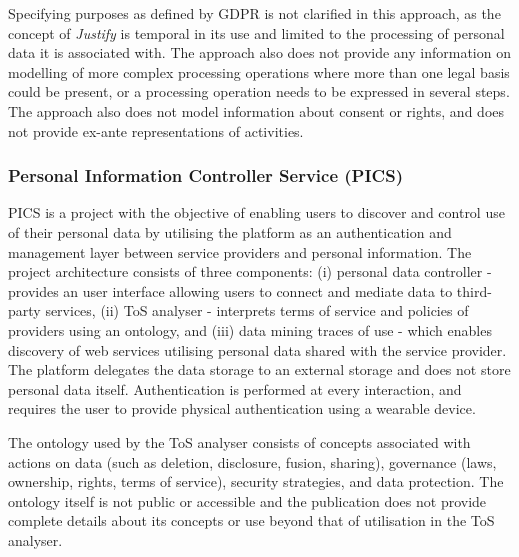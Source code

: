 Specifying purposes as defined by GDPR is not clarified in this approach, as the concept of \textit{Justify} is temporal in its use and limited to the processing of personal data it is associated with. The approach also does not provide any information on modelling of more complex processing operations where more than one legal basis could be present, or a processing operation needs to be expressed in several steps. The approach also does not model information about consent or rights, and does not provide ex-ante representations of activities.

\subsubsection{Personal Information Controller Service (PICS)}
PICS is a project with the objective of enabling users to discover and control use of their personal data by utilising the platform as an authentication and management layer between service providers and personal information. The project architecture \cite{winckler_personal_2019} consists of three components: (i) personal data controller - provides an user interface allowing users to connect and mediate data to third-party services, (ii) ToS analyser - interprets terms of service and policies of providers using an ontology, and (iii) data mining traces of use - which enables discovery of web services utilising personal data shared with the service provider. The platform delegates the data storage to an external storage and does not store personal data itself. Authentication is performed at every interaction, and requires the user to provide physical authentication using a wearable device.

The ontology used by the ToS analyser \cite{benfenatki_towards_2018} consists of concepts associated with actions on data (such as deletion, disclosure, fusion, sharing), governance (laws, ownership, rights, terms of service), security strategies, and data protection. The ontology itself is not public or accessible and the publication does not provide complete details about its concepts or use beyond that of utilisation in the ToS analyser.

